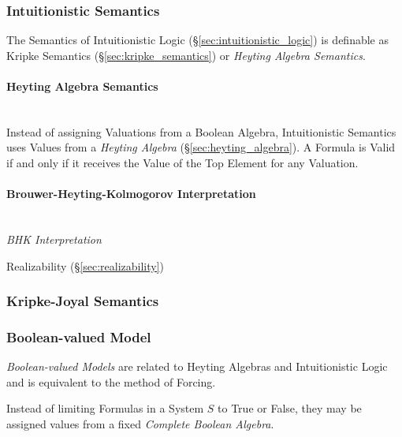 \subsubsection{Intuitionistic Semantics}
\label{sec:intuitionistic_semantics}

The Semantics of Intuitionistic Logic
(\S\ref{sec:intuitionistic_logic}) is definable as Kripke Semantics
(\S\ref{sec:kripke_semantics}) or \emph{Heyting Algebra Semantics}.



\paragraph{Heyting Algebra Semantics}\label{sec:heyting_semantics}
\hfill \\

Instead of assigning Valuations from a Boolean Algebra, Intuitionistic
Semantics uses Values from a \emph{Heyting Algebra}
(\S\ref{sec:heyting_algebra}). A Formula is Valid if and only if it
receives the Value of the Top Element for any Valuation.



\paragraph{Brouwer-Heyting-Kolmogorov Interpretation}
\label{sec:brouwer-heyting-kolmogorov}
\hfill \\

\emph{BHK Interpretation}

Realizability (\S\ref{sec:realizability})



\subsubsection{Kripke-Joyal Semantics}\label{sec:kripke_joyal}

\subsubsection{Boolean-valued Model}\label{sec:boolean_model}

\emph{Boolean-valued Models} are related to Heyting Algebras and
Intuitionistic Logic and is equivalent to the method of Forcing.

Instead of limiting Formulas in a System $S$ to True or False, they
may be assigned values from a fixed \emph{Complete Boolean Algebra}.



